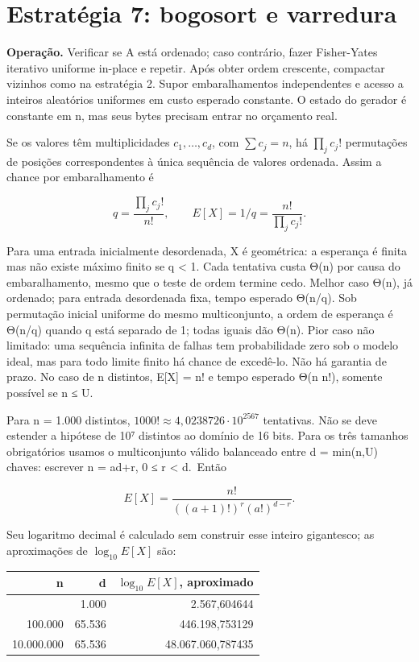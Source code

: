 \documentclass[
  brazilian,
  11pt,
  a4paper,
]{article}
\newcounter{none} %
\let\oldsection\section
\renewcommand{\section}{\Needspace{6\baselineskip}\oldsection}
\begin{document}
\section{Estratégia 7: bogosort e
varredura}\label{estratuxe9gia-7-bogosort-e-varredura}

\textbf{Operação.} Verificar se A está ordenado; caso contrário, fazer
Fisher-Yates iterativo uniforme in-place e repetir. Após obter ordem
crescente, compactar vizinhos como na estratégia 2. Supor
embaralhamentos independentes e acesso a inteiros aleatórios uniformes
em custo esperado constante. O estado do gerador é constante em n, mas
seus bytes precisam entrar no orçamento real.

Se os valores têm multiplicidades \(c_1,\ldots,c_d\), com
\(\sum c_j=n\), há \(\prod_j c_j!\) permutações de posições
correspondentes à única sequência de valores ordenada. Assim a chance
por embaralhamento é

\[q=\frac{\prod_j c_j!}{n!},\qquad
E[X]=1/q=\frac{n!}{\prod_j c_j!}.\]

Para uma entrada inicialmente desordenada, X é geométrica: a esperança é
finita mas não existe máximo finito se q \textless{} 1. Cada tentativa
custa Θ(n) por causa do embaralhamento, mesmo que o teste de ordem
termine cedo. Melhor caso Θ(n), já ordenado; para entrada desordenada
fixa, tempo esperado Θ(n/q). Sob permutação inicial uniforme do mesmo
multiconjunto, a ordem de esperança é Θ(n/q) quando q está separado de
1; todas iguais dão Θ(n). Pior caso não limitado: uma sequência infinita
de falhas tem probabilidade zero sob o modelo ideal, mas para todo
limite finito há chance de excedê-lo. Não há garantia de prazo. No caso
de n distintos, E{[}X{]} = n! e tempo esperado Θ(n n!), somente possível
se n ≤ U.

Para n = 1.000 distintos, \(1000!\approx4,0238726\cdot10^{2567}\)
tentativas. Não se deve estender a hipótese de 10⁷ distintos ao domínio
de 16 bits. Para os três tamanhos obrigatórios usamos o multiconjunto
válido balanceado entre d = min(n,U) chaves: escrever n = ad+r, 0 ≤ r
\textless{} d.~Então

\[E[X]=\frac{n!}{((a+1)!)^r(a!)^{d-r}}.\]

Seu logaritmo decimal é calculado sem construir esse inteiro gigantesco;
as aproximações de \(\log_{10}E[X]\) são:

{\def\LTcaptype{none} %
\begin{longtable}[]{@{}rrr@{}}
\toprule\noalign{}
n & d & \(\log_{10} E[X]\), aproximado \\
\midrule\noalign{}
\endhead
\bottomrule\noalign{}
\endlastfoot
1.000 & 1.000 & 2.567,604644 \\
100.000 & 65.536 & 446.198,753129 \\
10.000.000 & 65.536 & 48.067.060,787435 \\
\end{longtable}
}
\end{document}
